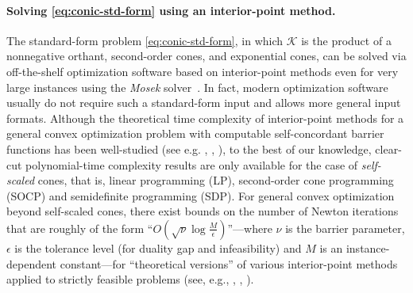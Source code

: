\paragraph{Solving \eqref{eq:conic-std-form} using an interior-point method.}
The standard-form problem \eqref{eq:conic-std-form}, in which $\mathcal{K}$ is the product of a nonnegative orthant, second-order cones, and exponential cones, can be solved via off-the-shelf optimization software based on interior-point methods even for very large instances using the \emph{Mosek} solver~\citep{mosek2010mosek,dahl2019primal}. In fact, modern optimization software usually do not require such a standard-form input and allows more general input formats.
Although the theoretical time complexity of interior-point methods for a general convex optimization problem with computable self-concordant barrier functions has been well-studied (see e.g. \citep{nesterov1994interior}, \citep[\S 5]{nesterov2018lectures}, \citep[\S 4]{nemirovski2004interior}), to the best of our knowledge, clear-cut polynomial-time complexity results are only available for the case of \emph{self-scaled} cones, that is, linear programming (LP), second-order cone programming (SOCP) and semidefinite programming (SDP).
For general convex optimization beyond self-scaled cones, there exist bounds on the number of Newton iterations that are roughly of the form ``$O\left(\sqrt{\nu}\log \frac{M}{\epsilon}\right)$''---where $\nu$ is the barrier parameter, $\epsilon$ is the tolerance level (for duality gap and infeasibility) and $M$ is an instance-dependent constant---for ``theoretical versions'' of various interior-point methods applied to strictly feasible problems (see, e.g., \cite[\S3 and \S6]{nesterov1994interior}, \cite[5.3.4]{nesterov2018lectures}, \cite[\S 4 and \S 7]{nemirovski2004interior}).
